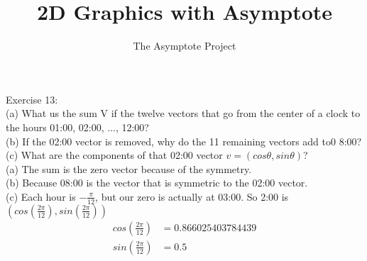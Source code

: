 \documentclass[12pt]{article}
\title{2D Graphics with Asymptote}
\author{The Asymptote Project}
\newcommand{\insertrep}[1]{%
	\hspace*{-2.4cm}
	\fbox{\texttt{[image: \#1]}}
}
\begin{document}
	Exercise 13:\\
	(a) What us the sum V if the twelve vectors that go from the center of a clock to the hours 01:00, 02:00, ..., 12:00?\\
	(b) If the 02:00 vector is removed, why do the 11 remaining vectors add to0 8:00?\\
	(c) What are the components of that 02:00 vector $v = (cos \theta, sin \theta)$?
	\\
	(a) The sum is the zero vector because of the symmetry.\\
	(b) Because 08:00 is the vector that is symmetric to the 02:00 vector.\\
	(c) Each hour is $-\frac{\pi}{12}$, but our zero is actually at 03:00. So 2:00 is $(cos(\frac{2\pi}{12}),sin(\frac{2\pi}{12}))$\\
	\begin{align*}
		cos(\frac{2\pi}{12}) &= 0.866025403784439\\
		sin(\frac{2\pi}{12}) &= 0.5\\
	\end{align*}
	
	\begin{center}
		\insertrep{exercise01013.pdf}
	\end{center}
\end{document}
